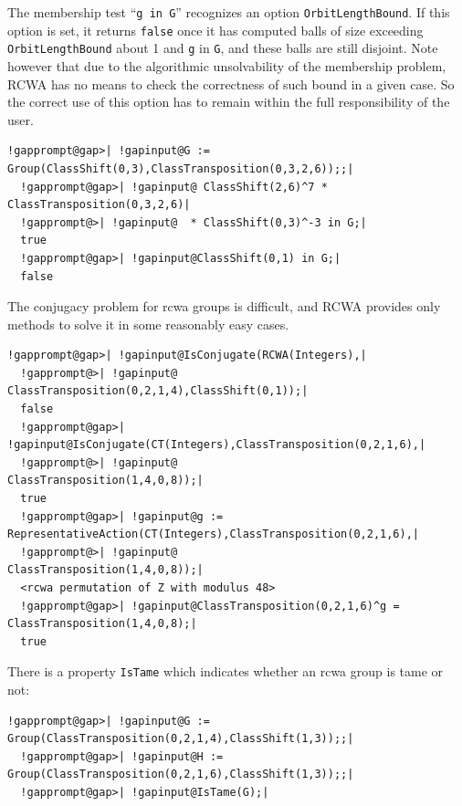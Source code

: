 \documentclass[a4paper,11pt]{report}
\begin{document}
{{ The membership test ``\texttt{g in G}'' recognizes an option \texttt{OrbitLengthBound}. If this option is set, it returns \texttt{false} once it has computed balls of size exceeding \texttt{OrbitLengthBound} about 1 and \texttt{g} in \texttt{G}, and these balls are still disjoint. Note however that due to the algorithmic
unsolvability of the membership problem, \textsf{RCWA} has no means to check the correctness of such bound in a given case. So the
correct use of this option has to remain within the full responsibility of the
user. 
\begin{Verbatim}[commandchars=!@|,fontsize=\small,frame=single,label=Example]
  !gapprompt@gap>| !gapinput@G := Group(ClassShift(0,3),ClassTransposition(0,3,2,6));;|
  !gapprompt@gap>| !gapinput@ ClassShift(2,6)^7 * ClassTransposition(0,3,2,6)|
  !gapprompt@>| !gapinput@  * ClassShift(0,3)^-3 in G;|
  true
  !gapprompt@gap>| !gapinput@ClassShift(0,1) in G;|
  false
\end{Verbatim}
    The conjugacy problem for rcwa groups is difficult, and \textsf{RCWA} provides only methods to solve it in some reasonably easy cases. 
\begin{Verbatim}[commandchars=!@|,fontsize=\small,frame=single,label=Example]
  !gapprompt@gap>| !gapinput@IsConjugate(RCWA(Integers),|
  !gapprompt@>| !gapinput@               ClassTransposition(0,2,1,4),ClassShift(0,1));|
  false
  !gapprompt@gap>| !gapinput@IsConjugate(CT(Integers),ClassTransposition(0,2,1,6),|
  !gapprompt@>| !gapinput@                            ClassTransposition(1,4,0,8));|
  true
  !gapprompt@gap>| !gapinput@g := RepresentativeAction(CT(Integers),ClassTransposition(0,2,1,6),|
  !gapprompt@>| !gapinput@                                          ClassTransposition(1,4,0,8));|
  <rcwa permutation of Z with modulus 48>
  !gapprompt@gap>| !gapinput@ClassTransposition(0,2,1,6)^g = ClassTransposition(1,4,0,8);|
  true
\end{Verbatim}
  There is a property \texttt{IsTame} which indicates whether an rcwa group is tame or not: 
\begin{Verbatim}[commandchars=!@|,fontsize=\small,frame=single,label=Example]
  !gapprompt@gap>| !gapinput@G := Group(ClassTransposition(0,2,1,4),ClassShift(1,3));;|
  !gapprompt@gap>| !gapinput@H := Group(ClassTransposition(0,2,1,6),ClassShift(1,3));;|
  !gapprompt@gap>| !gapinput@IsTame(G);|

\end{Verbatim}}}
\end{document}
